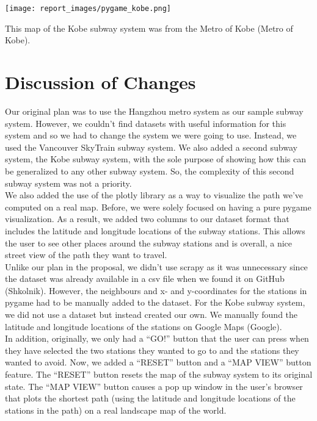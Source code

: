 \documentclass[fontsize=11pt]{article}
\begin{document}
\bigskip

\centerline{
    \texttt{[image: report\_images/pygame\_kobe.png]}
}

\bigskip 

This map of the Kobe subway system was from the Metro of Kobe (Metro of Kobe).

\bigskip

\section*{Discussion of Changes} 

Our original plan was to use the Hangzhou metro system as our sample subway system. However, we couldn’t find datasets with useful information for this system and so we had to change the system we were going to use. Instead, we used the Vancouver SkyTrain subway system. We also added a second subway system, the Kobe subway system, with the sole purpose of showing how this can be generalized to any other subway system. So, the complexity of this second subway system was not a priority. \\

We also added the use of the plotly library as a way to visualize the path we've computed on a real map. Before, we were solely focused on having a pure pygame visualization. As a result, we added two columns to our dataset format that includes the latitude and longitude locations of the subway stations. This allows the user to see other places around the subway stations and is overall, a nice street view of the path they want to travel. \\

Unlike our plan in the proposal, we didn’t use scrapy as it was unnecessary since the dataset was already available in a csv file when we found it on GitHub (Shkolnik). However, the neighbours and x- and y-coordinates for the stations in pygame had to be manually added to the dataset. For the Kobe subway system, we did not use a dataset but instead created our own. We manually found the latitude and longitude locations of the stations on Google Maps (Google).  \\

In addition, originally, we only had a ``GO!” button that the user can press when they have selected the two stations they wanted to go to and the stations they wanted to avoid. Now, we added a ``RESET” button and a ``MAP VIEW” button feature. The ``RESET” button resets the map of the subway system to its original state. The ``MAP VIEW” button causes a pop up window in the user’s browser that plots the shortest path (using the latitude and longitude locations of the stations in the path) on a real landscape map of the world. \\
\end{document}

